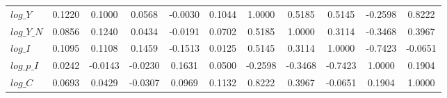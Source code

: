 \begin{center}
\begin{longtable}{lcccccccccc}
$log\_Y          $	 & 	            0.1220	 & 	            0.1000	 & 	            0.0568	 & 	           -0.0030	 & 	            0.1044	 & 	            1.0000	 & 	            0.5185	 & 	            0.5145	 & 	           -0.2598	 & 	            0.8222 \\ 
$log\_Y\_N       $	 & 	            0.0856	 & 	            0.1240	 & 	            0.0434	 & 	           -0.0191	 & 	            0.0702	 & 	            0.5185	 & 	            1.0000	 & 	            0.3114	 & 	           -0.3468	 & 	            0.3967 \\ 
$log\_I          $	 & 	            0.1095	 & 	            0.1108	 & 	            0.1459	 & 	           -0.1513	 & 	            0.0125	 & 	            0.5145	 & 	            0.3114	 & 	            1.0000	 & 	           -0.7423	 & 	           -0.0651 \\ 
$log\_p\_I       $	 & 	            0.0242	 & 	           -0.0143	 & 	           -0.0230	 & 	            0.1631	 & 	            0.0500	 & 	           -0.2598	 & 	           -0.3468	 & 	           -0.7423	 & 	            1.0000	 & 	            0.1904 \\ 
$log\_C          $	 & 	            0.0693	 & 	            0.0429	 & 	           -0.0307	 & 	            0.0969	 & 	            0.1132	 & 	            0.8222	 & 	            0.3967	 & 	           -0.0651	 & 	            0.1904	 & 	            1.0000 \\ 
\end{longtable}
 \end{center}
